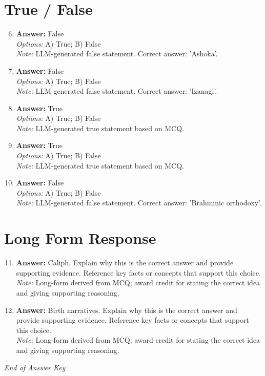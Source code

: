 \documentclass[12pt]{article}
\begin{document}
\section*{True / False}
\begin{enumerate}[label=\arabic*.]
\setcounter{enumi}{5}
\item \textbf{Answer:} False
\\ \textit{Options:} A) True; B) False
\\ \textit{Note:} LLM-generated false statement. Correct answer: 'Ashoka'.
\item \textbf{Answer:} False
\\ \textit{Options:} A) True; B) False
\\ \textit{Note:} LLM-generated false statement. Correct answer: 'Izanagi'.
\item \textbf{Answer:} True
\\ \textit{Options:} A) True; B) False
\\ \textit{Note:} LLM-generated true statement based on MCQ.
\item \textbf{Answer:} True
\\ \textit{Options:} A) True; B) False
\\ \textit{Note:} LLM-generated true statement based on MCQ.
\item \textbf{Answer:} False
\\ \textit{Options:} A) True; B) False
\\ \textit{Note:} LLM-generated false statement. Correct answer: 'Brahminic orthodoxy'.
\end{enumerate}

\section*{Long Form Response}
\begin{enumerate}[label=\arabic*.]
\setcounter{enumi}{10}
\item \textbf{Answer:} Caliph. Explain why this is the correct answer and provide supporting evidence. Reference key facts or concepts that support this choice.
\\ \textit{Note:} Long-form derived from MCQ; award credit for stating the correct idea and giving supporting reasoning.
\item \textbf{Answer:} Birth narratives. Explain why this is the correct answer and provide supporting evidence. Reference key facts or concepts that support this choice.
\\ \textit{Note:} Long-form derived from MCQ; award credit for stating the correct idea and giving supporting reasoning.
\end{enumerate}

\vfill
\noindent\textit{End of Answer Key}
\end{document}
